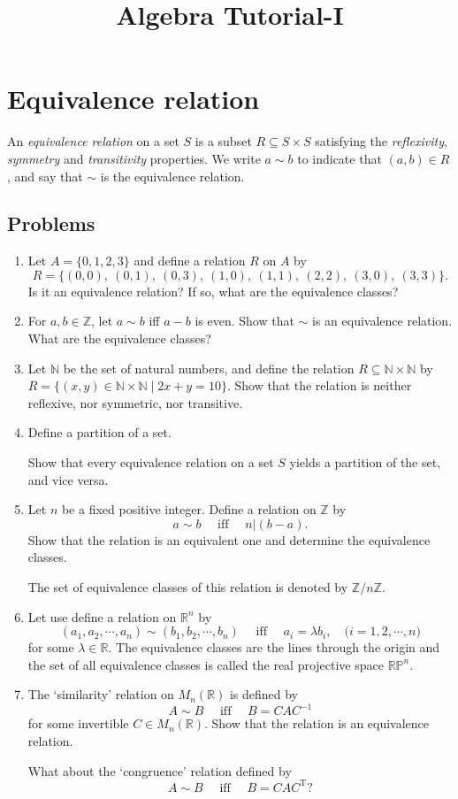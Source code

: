 \documentclass{article}
\title{Algebra Tutorial-I}
\begin{document}
\section*{Equivalence relation}
An \emph{equivalence relation} on a set \( S \) is a subset \( R \subseteq S \times S \) satisfying the \emph{reflexivity}, \emph{symmetry} and \emph{transitivity} properties.
We write \( a \sim b \) to indicate that \( (a, b) \in R \), and say that \( \sim \) is the equivalence relation.
\subsection*{Problems}
\begin{enumerate}
    \item Let \( A = \{0, 1, 2, 3\} \) and define a relation \( R \) on \( A \) by
\[
R = \{(0,0),\ (0,1),\ (0,3),\ (1,0),\ (1,1),\ (2,2),\ (3,0),\ (3,3)\}.
\] Is it an equivalence relation? If so, what are the equivalence classes?
\item For $a,b\in \mathbb Z$, let $a\sim b$ iff $a-b$ is even. Show that $\sim$ is an equivalence relation. {What are the equivalence classes}?
\item Let \( \mathbb{N} \) be the set of natural numbers, and define the relation \( R \subseteq \mathbb{N} \times \mathbb{N} \) by
$R = \{ (x, y) \in \mathbb{N} \times \mathbb{N} \mid 2x + y = 10 \}.$ Show that the relation is neither reflexive, nor symmetric, nor transitive.
\item Define a partition of a set. 

Show that every equivalence relation on a set $S$ yields a partition of the set, and vice versa.
\item Let $n$ be a fixed positive integer. Define a relation on $\mathbb Z$ by \[a\sim b \quad\text{ iff }\quad n\vert(b-a).\] Show that the relation is an equivalent one and determine the equivalence classes.

The set of equivalence classes of this relation is denoted by $\mathbb Z/n\mathbb Z.$

\item Let use define a relation on $\mathbb R^n$ by
\[(a_1,a_2,\cdots,a_n)\sim (b_1,b_2,\cdots,b_n) \quad\text{ iff }\quad a_i=\lambda b_i,\quad \text{($i=1,2,\cdots,n$})\] for some $\lambda\in \mathbb R.$ The equivalence classes are the lines through the origin and the set of all equivalence classes is called the real projective space $\mathbb{RP}^n.$

\item The `similarity' relation on $M_n(\mathbb R)$ is defined by \[A\sim B \quad\text{ iff }\quad B=CAC^{-1}\] for some invertible $C\in M_n(\mathbb R).$ Show that the relation is an equivalence relation.

What about the `congruence' relation defined by \[A\sim B \quad\text{ iff }\quad B=CAC^{\mathrm T}?\]
\end{enumerate}
\end{document}
